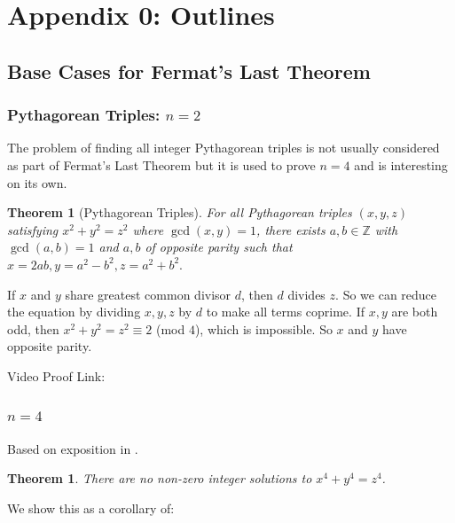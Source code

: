\documentclass{article}
\newtheorem{theorem}{Theorem}[section]
\newtheorem{thm}{Theorem}[section]
\theoremstyle{definition}
\theoremstyle{definition}
\theoremstyle{definition}
\begin{document}
\section{Appendix 0: Outlines}


 \subsection{Base Cases for Fermat's Last Theorem}

\subsubsection{Pythagorean Triples: $n=2$} The problem of finding all integer Pythagorean triples is not usually considered as part of Fermat's Last Theorem but it is used to prove $n=4$ and is interesting on its own.

\begin{theorem}[Pythagorean Triples]\label{pythagdio}
     For all Pythagorean triples $(x,y,z)$ satisfying $x^2+y^2=z^2$ where $\gcd(x,y)=1$, there exists $a,b\in\mathbb{Z}$ with $\gcd(a,b)=1$ and $a,b$ of opposite parity such that $x=2ab, y=a^2-b^2, z=a^2+b^2.$ 
\end{theorem}

If $x$ and $y$ share greatest common divisor $d$, then $d$ divides $z$. So we can reduce the equation by dividing $x,y,z$ by $d$ to make all terms coprime. If $x,y$ are both odd, then  $x^2+y^2=z^2\equiv2 $ (mod $4$), which is impossible. So $x$ and $y$ have opposite parity. 



Video Proof Link:


    
\subsubsection{$n=4$}

  Based on exposition in \cite{HW}.  
\begin{thm}\label{n4}
    There are no non-zero integer solutions to $x^4+y^4=z^4$. 

\end{thm}
We show this as a corollary of:
\end{document}
